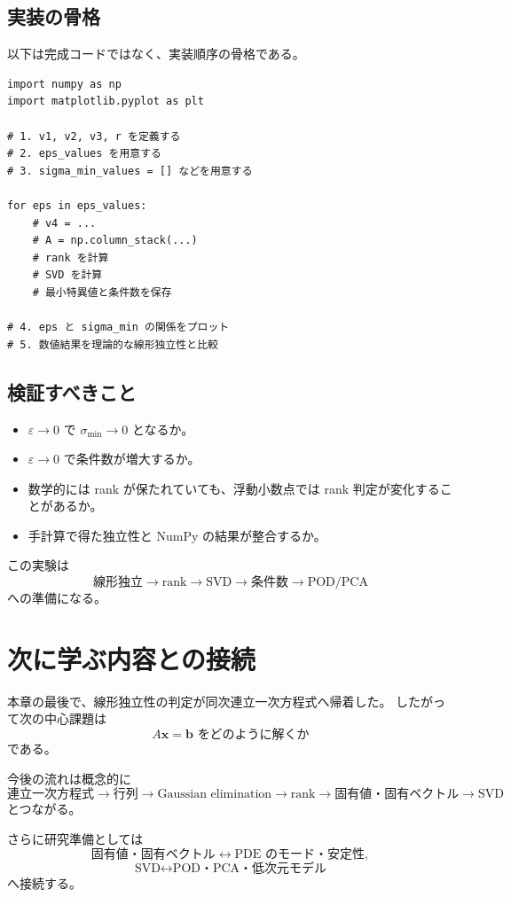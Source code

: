 \documentclass[a4paper,11pt]{ltjsarticle}
\begin{document}
\subsection{実装の骨格}
以下は完成コードではなく、実装順序の骨格である。
\begin{verbatim}
import numpy as np
import matplotlib.pyplot as plt

# 1. v1, v2, v3, r を定義する
# 2. eps_values を用意する
# 3. sigma_min_values = [] などを用意する

for eps in eps_values:
    # v4 = ...
    # A = np.column_stack(...)
    # rank を計算
    # SVD を計算
    # 最小特異値と条件数を保存

# 4. eps と sigma_min の関係をプロット
# 5. 数値結果を理論的な線形独立性と比較
\end{verbatim}

\subsection{検証すべきこと}
\begin{itemize}
  \item $\varepsilon\to0$ で $\sigma_{\min}\to0$ となるか。
  \item $\varepsilon\to0$ で条件数が増大するか。
  \item 数学的には rank が保たれていても、浮動小数点では rank 判定が変化することがあるか。
  \item 手計算で得た独立性と NumPy の結果が整合するか。
\end{itemize}

この実験は
\[
\boxed{
\text{線形独立}
\to \text{rank}
\to \text{SVD}
\to \text{条件数}
\to \text{POD/PCA}
}
\]
への準備になる。

\section{次に学ぶ内容との接続}

本章の最後で、線形独立性の判定が同次連立一次方程式へ帰着した。
したがって次の中心課題は
\[
\boxed{A\bm{x}=\bm{b}\text{ をどのように解くか}}
\]
である。

今後の流れは概念的に
\[
\text{連立一次方程式}
\to \text{行列}
\to \text{Gaussian elimination}
\to \text{rank}
\to \text{固有値・固有ベクトル}
\to \text{SVD}
\]
とつながる。

さらに研究準備としては
\[
\text{固有値・固有ベクトル}
\leftrightarrow
\text{PDE のモード・安定性},
\]
\[
\text{SVD}
\leftrightarrow
\text{POD・PCA・低次元モデル}
\]
へ接続する。
\end{document}
